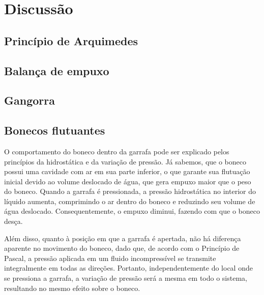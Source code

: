 \section{Discussão}
\subsection{Princípio de Arquimedes}

\subsection{Balança de empuxo}

\subsection{Gangorra}

\subsection{Bonecos flutuantes}
O comportamento do boneco dentro da garrafa pode ser explicado pelos princípios
da hidrostática e da variação de pressão. Já sabemos, que o boneco possui uma
cavidade com ar em sua parte inferior, o que garante sua flutuação inicial
devido ao volume deslocado de água, que gera empuxo maior que o peso do boneco.
Quando a garrafa é pressionada, a pressão hidrostática no interior do líquido
aumenta, comprimindo o ar dentro do boneco e reduzindo seu volume de água
deslocado. Consequentemente, o empuxo diminui, fazendo com que o boneco desça.

Além disso, quanto à posição em que a garrafa é apertada, não há diferença
aparente no movimento do boneco, dado que, de acordo com o Princípio de Pascal,
a pressão aplicada em um fluido incompressível se transmite integralmente em
todas as direções. Portanto, independentemente do local onde se pressiona a
garrafa, a variação de pressão será a mesma em todo o sistema, resultando no
mesmo efeito sobre o boneco.
